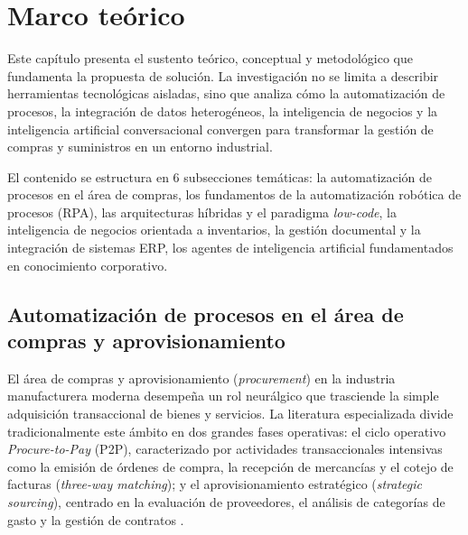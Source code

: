
\section{Marco teórico} \label{sec:marco_teorico} %

Este capítulo presenta el sustento teórico, conceptual y metodológico que fundamenta la propuesta de solución. La investigación no se limita a describir herramientas tecnológicas aisladas, sino que analiza cómo la automatización de procesos, la integración de datos heterogéneos, la inteligencia de negocios y la inteligencia artificial conversacional convergen para transformar la gestión de compras y suministros en un entorno industrial.

El contenido se estructura en 6 subsecciones temáticas: la automatización de procesos en el área de compras, los fundamentos de la automatización robótica de procesos (RPA), las arquitecturas híbridas y el paradigma \emph{low-code}, la inteligencia de negocios orientada a inventarios, la gestión documental y la integración de sistemas ERP, los agentes de inteligencia artificial fundamentados en conocimiento corporativo.

\subsection{Automatización de procesos en el área de compras y aprovisionamiento}

El área de compras y aprovisionamiento (\emph{procurement}) en la industria manufacturera moderna desempeña un rol neurálgico que trasciende la simple adquisición transaccional de bienes y servicios. La literatura especializada divide tradicionalmente este ámbito en dos grandes fases operativas: el ciclo operativo \emph{Procure-to-Pay} (P2P), caracterizado por actividades transaccionales intensivas como la emisión de órdenes de compra, la recepción de mercancías y el cotejo de facturas (\emph{three-way matching}); y el aprovisionamiento estratégico (\emph{strategic sourcing}), centrado en la evaluación de proveedores, el análisis de categorías de gasto y la gestión de contratos \cite{flechsig2022rpa}.

